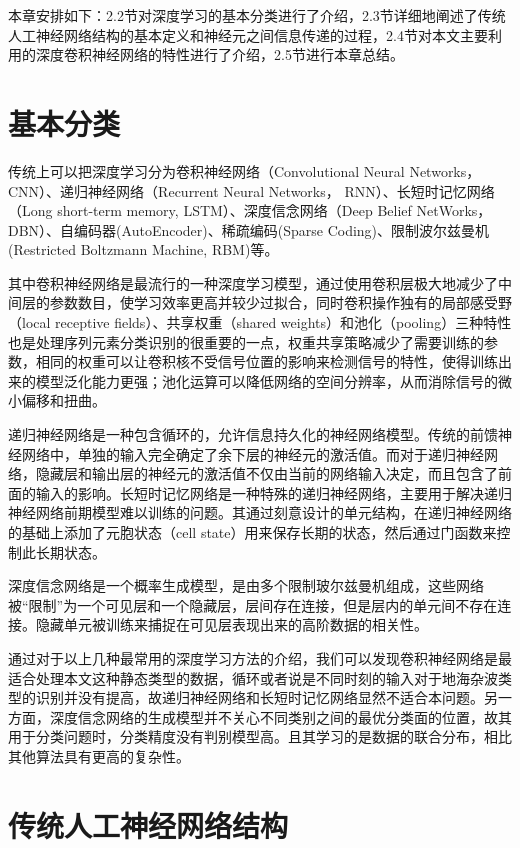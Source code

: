 本章安排如下：2.2节对深度学习的基本分类进行了介绍，2.3节详细地阐述了传统人工神经网络结构的基本定义和神经元之间信息传递的过程，2.4节对本文主要利用的深度卷积神经网络的特性进行了介绍，2.5节进行本章总结。


\section{基本分类}
传统上可以把深度学习分为卷积神经网络（Convolutional Neural Networks， CNN）、递归神经网络（Recurrent Neural Networks， RNN）、长短时记忆网络（Long short-term memory, LSTM）、深度信念网络（Deep Belief NetWorks，DBN）、自编码器(AutoEncoder)、稀疏编码(Sparse Coding)、限制波尔兹曼机(Restricted Boltzmann Machine, RBM)等。

其中卷积神经网络是最流行的一种深度学习模型，通过使用卷积层极大地减少了中间层的参数数目，使学习效率更高并较少过拟合，同时卷积操作独有的局部感受野（local receptive fields）、共享权重（shared weights）和池化（pooling）三种特性也是处理序列元素分类识别的很重要的一点，权重共享策略减少了需要训练的参数，相同的权重可以让卷积核不受信号位置的影响来检测信号的特性，使得训练出来的模型泛化能力更强；池化运算可以降低网络的空间分辨率，从而消除信号的微小偏移和扭曲。

递归神经网络是一种包含循环的，允许信息持久化的神经网络模型。传统的前馈神经网络中，单独的输入完全确定了余下层的神经元的激活值。而对于递归神经网络，隐藏层和输出层的神经元的激活值不仅由当前的网络输入决定，而且包含了前面的输入的影响。长短时记忆网络是一种特殊的递归神经网络，主要用于解决递归神经网络前期模型难以训练的问题。其通过刻意设计的单元结构，在递归神经网络的基础上添加了元胞状态（cell state）用来保存长期的状态，然后通过门函数来控制此长期状态。

深度信念网络是一个概率生成模型，是由多个限制玻尔兹曼机组成，这些网络被“限制”为一个可见层和一个隐藏层，层间存在连接，但是层内的单元间不存在连接。隐藏单元被训练来捕捉在可见层表现出来的高阶数据的相关性。

通过对于以上几种最常用的深度学习方法的介绍，我们可以发现卷积神经网络是最适合处理本文这种静态类型的数据，循环或者说是不同时刻的输入对于地海杂波类型的识别并没有提高，故递归神经网络和长短时记忆网络显然不适合本问题。另一方面，深度信念网络的生成模型并不关心不同类别之间的最优分类面的位置，故其用于分类问题时，分类精度没有判别模型高。且其学习的是数据的联合分布，相比其他算法具有更高的复杂性。

\section{传统人工神经网络结构}

